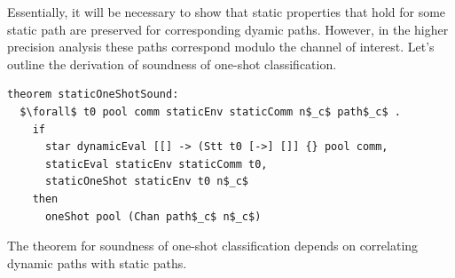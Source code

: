 \documentclass[letterpaper, 11pt]{extarticle}
\begin{document}
Essentially, it will be necessary to show that static
properties that hold for some static path are preserved for corresponding dyamic paths. 
However, in the higher precision analysis these paths correspond modulo the channel of interest.
Let's outline the derivation of soundness of one-shot classification.

\begin{lstlisting}[language=logic, mathescape]
  theorem staticOneShotSound:
  $\forall$ t0 pool comm staticEnv staticComm n$_c$ path$_c$ . 
    if
      star dynamicEval [[] -> (Stt t0 [->] []] {} pool comm,
      staticEval staticEnv staticComm t0,
      staticOneShot staticEnv t0 n$_c$
    then 
      oneShot pool (Chan path$_c$ n$_c$)
\end{lstlisting}

The theorem for soundness of one-shot classification depends on
correlating dynamic paths with static paths.
\end{document}
